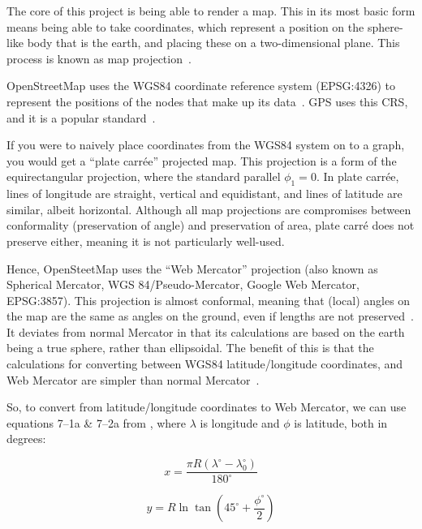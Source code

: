 The core of this project is being able to render a map. This in its most basic form means being able to take coordinates, which represent a position on the sphere-like body that is the earth, and placing these on a two-dimensional plane. This process is known as map projection~\cite[5]{canters2002small}.

OpenStreetMap uses the WGS84 coordinate reference system (EPSG:4326) to represent the positions of the nodes that make up its data~\cite{osm-wiki-wgs84}. GPS uses this CRS, and it is a popular standard~\cite{epsg.io-epsg:4326}.

If you were to naively place coordinates from the WGS84 system on to a graph, you would get a ``plate carrée'' projected map. This projection is a form of the equirectangular projection, where the standard parallel \(\phi_1 = 0\). In plate carrée, lines of longitude are straight, vertical and equidistant, and lines of latitude are similar, albeit horizontal. Although all map projections are compromises between conformality (preservation of angle) and preservation of area, plate carré does not preserve either, meaning it is not particularly well-used.

Hence, OpenSteetMap uses the ``Web Mercator'' projection (also known as Spherical Mercator, WGS 84/Pseudo-Mercator, Google Web Mercator, EPSG:3857). This projection is almost conformal, meaning that (local) angles on the map are the same as angles on the ground, even if lengths are not preserved~\cite{carto-implications-of-webmercator,}. It deviates from normal Mercator in that its calculations are based on the earth being a true sphere, rather than ellipsoidal. The benefit of this is that the calculations for converting between WGS84 latitude/longitude coordinates, and Web Mercator are simpler than normal Mercator~\cite{ugrc-earth-not-round}.

So, to convert from latitude/longitude coordinates to Web Mercator, we can use equations 7--1a \& 7--2a from \textcite[41]{snyder1987map}, where \(\lambda{}\) is longitude and \(\phi{}\) is latitude, both in degrees:

\[x = \frac{\pi R(\lambda^\circ - \lambda^\circ_0)}{180^\circ} \]

\[y = R \ln \tan \left( 45^\circ + \frac{\phi^\circ}{2} \right) \]
